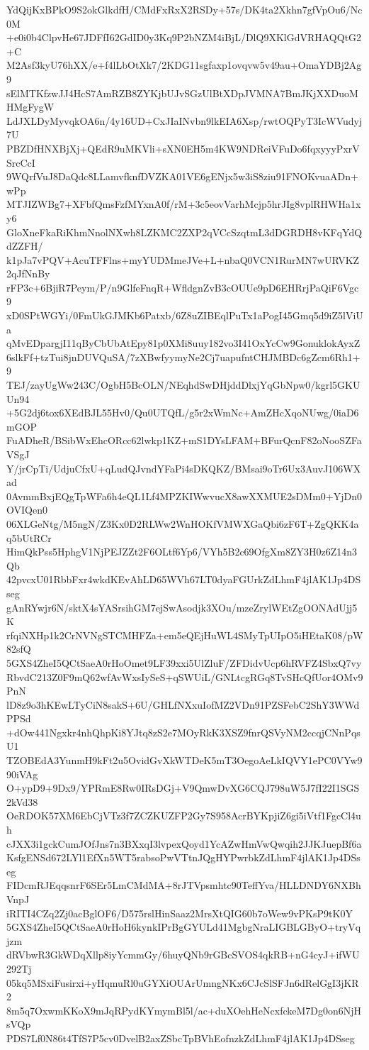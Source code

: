 YdQijKxBPkO9S2okGlkdfH/CMdFxRxX2RSDy+57s/DK4ta2Xkhn7gfVpOu6/Nc0M
+e0i0b4ClpvHe67JDFfI62GdID0y3Kq9P2bNZM4iBjL/DlQ9XKlGdVRHAQQtG2+C
M2Asf3kyU76hXX/e+f4lLbOtXk7/2KDG11sgfaxp1ovqvw5v49au+OmaYDBj2Ag9
sElMTKfzwJJ4HcS7AmRZB8ZYKjbUJvSGzUlBtXDpJVMNA7BmJKjXXDuoMHMgFygW
LdJXLDyMyvqkOA6n/4y16UD+CxJIaINvbn9lkEIA6Xsp/rwtOQPyT3IcWVudyj7U
PBZDfHNXBjXj+QEdR9uMKVli+sXN0EH5m4KW9NDReiVFuDo6fqxyyyPxrVSrcCcI
9WQrfVuJ8DaQdc8LLamvfknfDVZKA01VE6gENjx5w3iS8ziu91FNOKvuaADn+wPp
MTJIZWBg7+XFbfQmsFzfMYxnA0f/rM+3c5eovVarhMcjp5hrJIg8vplRHWHa1xy6
GloXneFkaRiKhmNnolNXwh8LZKMC2ZXP2qVCcSzqtmL3dDGRDH8vKFqYdQdZZFH/
k1pJa7vPQV+AcuTFFlns+myYUDMmeJVe+L+nbaQ0VCN1RurMN7wURVKZ2qJfNnBy
rFP3c+6BjiR7Peym/P/n9GlfeFnqR+WfldgnZvB3cOUUe9pD6EHRrjPaQiF6Vgc9
xD0SPtWGYi/0FmUkGJMKb6Patxb/6Z8uZIBEqlPuTx1aPogI45Gmq5d9iZ5lViUa
qMvEDpargjI11qByCbUbAtEpy81p0XMi8uuy182vo3I41OxYcCw9GonuklokAyxZ
6slkFf+tzTui8jnDUVQuSA/7zXBwfyymyNe2Cj7uapufntCHJMBDc6gZcm6Rh1+9
TEJ/zayUgWw243C/OgbH5BcOLN/NEqhdSwDHjddDlxjYqGbNpw0/kgrl5GKUUn94
+5G2dj6tox6XEdBJL55Hv0/Qu0UTQfL/g5r2xWmNc+AmZHcXqoNUwg/0iaD6mGOP
FuADheR/BSibWxEhcORcc62lwkp1KZ+mS1DYsLFAM+BFurQcnF82oNooSZFaVSgJ
Y/jrCpTi/UdjuCfxU+qLudQJvndYFaPi4sDKQKZ/BMsai9oTr6Ux3AuvJ106WXad
0AvmmBxjEQgTpWFa6h4eQL1Lf4MPZKIWwvucX8awXXMUE2sDMm0+YjDn0OVIQen0
06XLGeNtg/M5ngN/Z3Kx0D2RLWw2WnHOKfVMWXGaQbi6zF6T+ZgQKK4aq5bUtRCr
HimQkPss5HphgV1NjPEJZZt2F6OLtf6Yp6/VYh5B2c69OfgXm8ZY3H0z6Z14n3Qb
42pvcxU01RbbFxr4wkdKEvAhLD65WVh67LT0dyaFGUrkZdLhmF4jlAK1Jp4DSseg
gAnRYwjr6N/sktX4sYASrsihGM7ejSwAsodjk3XOu/mzeZrylWEtZgOONAdUjj5K
rfqiNXHp1k2CrNVNgSTCMHFZa+em5eQEjHuWL4SMyTpUIpO5iHEtaK08/pW82sfQ
5GXS4ZheI5QCtSaeA0rHoOmet9LF39xxi5UlZluF/ZFDidvUcp6hRVFZ4SbxQ7vy
RbvdC213Z0F9mQ62wfAvWxsIySeS+qSWUiL/GNLtcgRGq8TvSHcQfUor4OMv9PnN
lD8z9o3hKEwLTyCiN8sakS+6U/GHLfNXxuIofMZ2VDn91PZSFebC2ShY3WWdPPSd
+dOw441Ngxkr4nhQhpKi8YJtq8zS2e7MOyRkK3XSZ9fnrQSVyNM2ccqjCNnPqsU1
TZOBEdA3YunmH9kFt2u5OvidGvXkWTDeK5mT3OegoAeLkIQVY1ePC0VYw990iVAg
O+ypD9+9Dx9/YPRmE8Rw0IRsDGj+V9QmwDvXG6CQJ798uW5J7fI22I1SGS2kVd38
OeRDOK57XM6EbCjVTz3f7ZCZKUZFP2Gy7S958AcrBYKpjiZ6gi5iVtf1FgcCl4uh
cJXX3i1gckCumJOfJns7n3BXxqI3lvpexQoyd1YcAZwHmVwQwqih2JJKJuepBf6a
KsfgENSd672LYl1EfXn5WT5rabsoPwVTtnJQgHYPwrbkZdLhmF4jlAK1Jp4DSseg
FIDcmRJEqqsnrF6SEr5LmCMdMA+8rJTVpsmhtc90TeffYva/HLLDNDY6NXBhVnpJ
iRITI4CZq2Zj0acBglOF6/D575rslHinSaaz2MrsXtQIG60b7oWew9vPKsP9tK0Y
5GXS4ZheI5QCtSaeA0rHoH6kynkIPrBgGYULd41MgbgNraLIGBLGByO+tryVqjzm
dRVbwR3GkWDqXllp8iyYcmmGy/6huyQNb9rGBcSVOS4qkRB+nG4cyJ+ifWU292Tj
05kq5MSxiFusirxi+yHqmuRl0uGYXiOUArUmngNKx6CJcSlSFJn6dRelGgI3jKR2
8m5q7OxwmKKoX9mJqRPydKYmymBl5l/ac+duXOehHeNcxfckeM7Dg0on6NjHsVQp
PDS7Lf0N86t4TfS7P5cv0DvelB2axZSbcTpBVhEofnzkZdLhmF4jlAK1Jp4DSseg
